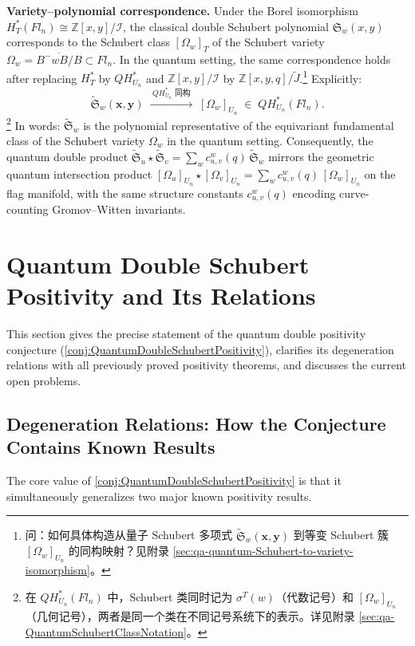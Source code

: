 \textbf{Variety--polynomial correspondence.} Under the Borel isomorphism $H_T^*(Fl_n) \cong \mathbb{Z}[x,y]/\mathcal{I}$, the classical double Schubert polynomial $\mathfrak{S}_w(x,y)$ corresponds to the Schubert class $[\Omega_w]_T$ of the Schubert variety $\Omega_w = \overline{B^-wB/B} \subset Fl_n$. In the quantum setting, the same correspondence holds after replacing $H_T^*$ by $QH_{U_n}^*$ and $\mathbb{Z}[x,y]/\mathcal{I}$ by $\mathbb{Z}[x,y,q]/\widetilde{J}$.\footnote{问：如何具体构造从量子 Schubert 多项式 $\widetilde{\mathfrak{S}}_w(\mathbf{x},\mathbf{y})$ 到等变 Schubert 簇 $[\Omega_w]_{U_n}$ 的同构映射？见附录 \cref{sec:qa-quantum-Schubert-to-variety-isomorphism}。} Explicitly:
$$\widetilde{\mathfrak{S}}_w(\mathbf{x},\mathbf{y}) \;\xrightarrow{\;QH_{U_n}^*\text{ 同构}\;}\; [\Omega_w]_{U_n} \;\in\; QH_{U_n}^*(Fl_n).$$\footnote{在 $QH_{U_n}^*(Fl_n)$ 中，Schubert 类同时记为 $\sigma^T(w)$（代数记号）和 $[\Omega_w]_{U_n}$（几何记号），两者是同一个类在不同记号系统下的表示。详见附录 \cref{sec:qa-QuantumSchubertClassNotation}。}
In words: $\widetilde{\mathfrak{S}}_w$ is the polynomial representative of the equivariant fundamental class of the Schubert variety $\Omega_w$ in the quantum setting. Consequently, the quantum double product $\widetilde{\mathfrak{S}}_u \star \widetilde{\mathfrak{S}}_v = \sum_w c_{u,v}^w(q) \, \widetilde{\mathfrak{S}}_w$ mirrors the geometric quantum intersection product $[\Omega_u]_{U_n} \star [\Omega_v]_{U_n} = \sum_w c_{u,v}^w(q) \, [\Omega_w]_{U_n}$ on the flag manifold, with the same structure constants $c_{u,v}^w(q)$ encoding curve-counting Gromov--Witten invariants.

\section{Quantum Double Schubert Positivity and Its Relations}
\label{sec:QuantumDoublePositivityAndRelations}

This section gives the precise statement of the quantum double positivity conjecture (\cref{conj:QuantumDoubleSchubertPositivity}), clarifies its degeneration relations with all previously proved positivity theorems, and discusses the current open problems.

\subsection{Degeneration Relations: How the Conjecture Contains Known Results}
\label{sec:DegenerationRelations}

The core value of \cref{conj:QuantumDoubleSchubertPositivity} is that it simultaneously generalizes two major known positivity results.

